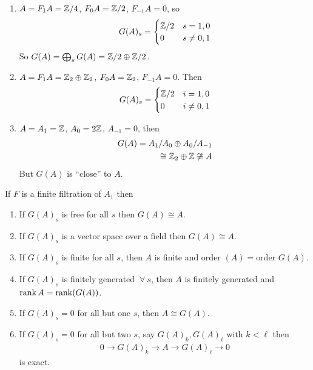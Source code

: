 \documentclass[12pt,class=article,crop=false]{standalone}
\begin{document}
\begin{eg}
\begin{enumerate}[label=(\arabic*)]
	\item $ A= F_1A = \mathbb{Z} /4$, $ F_0A= \mathbb{Z} /2$, $ F_{-1}A=0$, so
		\begin{align*}
			G(A)_s = \begin{cases}
				\mathbb{Z} /2 & s=1,0\\
				0 & s \neq 0,1\\
			\end{cases}
		\end{align*}
		So $ G(A) = \bigoplus_{ s}G(A) = \mathbb{Z} /2 \oplus  \mathbb{Z} /2 $.
	\item $ A = F_1A = \mathbb{Z}_2 \oplus \mathbb{Z}_2$, $ F_0A = \mathbb{Z}_2$, $ F_{-1}A = 0$. Then
		\begin{align*}
			G(A)_s = \begin{cases}
				\mathbb{Z} /2 & i = 1,0\\
				0 & i \neq 0,1\\
			\end{cases}
		\end{align*}
	\item $ A = A_1 = \mathbb{Z}$, $ A_0 = 2 \mathbb{Z}$, $ A_{-1}=0$, then
		\begin{align*}
			G(A) = A_1 / A_0 \oplus  A_0 / A_{-1}\\
			\cong \mathbb{Z}_2 \oplus \mathbb{Z} \not \cong A
		\end{align*}
		But $ G(A)$ is ``close'' to  $ A$.
\end{enumerate}
\end{eg}
\begin{lem}
If $ F$ is a finite filtration of  $ A_1$ then
\begin{enumerate}[label=(\arabic*)]
	\item If $ G(A)_s$ is free for all  $ s$ then  $ G(A) \cong A$.
	\item If $ G(A)_s$ is a vector space over a field then  $ G(A) \cong A$.
	\item If $ G(A)_s$ is finite for all  $ s$, then  $ A$ is finite and order $ (A) = $order $ G(A)$. 
	\item If  $ G(A)_s$ is finitely generated  $ \ \forall \ s$, then $ A$ is finitely generated and  $ \operatorname{rank} A = \operatorname{rank} (G(A))$.
	\item If  $ G(A)_s =0$ for all but one  $ s$, then  $ A \cong G(A)$.
	\item If $ G(A)_s = 0$ for all but two  $ s$, say  $ G(A)_k, G(A)_\ell$ with $ k < \ell$ then
		\begin{align*}
			0 \to G(A)_k \to A \to G(A)_{\ell} \to 0
		\end{align*}
is exact.
\end{enumerate}
\end{lem}
\end{document}
